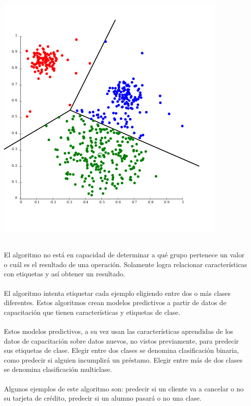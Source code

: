 \documentclass[11pt,a4paper]{article}
\begin{document}
\begin{enumerate}[A.]
    			\begin{center}	\includegraphics[scale=0.5]{./Imagenes/clasificacion}
    			\end{center}
			
			    \\El algoritmo no está en capacidad de determinar a qué grupo pertenece un valor o cuál es el resultado de una operación. Solamente logra relacionar características con etiquetas y así obtener un resultado.\\
			    
			    \\El algoritmo intenta etiquetar cada ejemplo eligiendo entre dos o más clases diferentes. Estos algoritmos crean modelos predictivos a partir de datos de capacitación que tienen características y etiquetas de clase.\\
			    
			    \\Estos modelos predictivos, a su vez usan las características aprendidas de los datos de capacitación sobre datos nuevos, no vistos previamente, para predecir sus etiquetas de clase. Elegir entre dos clases se denomina clasificación binaria, como predecir si alguien incumplirá un préstamo. Elegir entre más de dos clases se denomina clasificación multiclase.\\

                \\Algunos ejemplos de este algoritmo son: predecir si un cliente va a cancelar o no su tarjeta de crédito, predecir si un alumno pasará o no una clase.\\


\end{enumerate}
\end{document}
